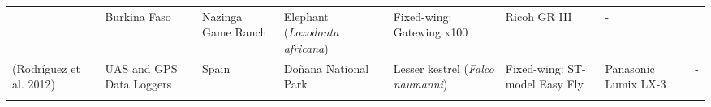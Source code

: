\documentclass[]{interact}
\theoremstyle{plain}%
\theoremstyle{definition}
\theoremstyle{remark}
\begin{document}
\begin{longtable}[]{@{}llllllll@{}}
\begin{minipage}[t]{0.18\columnwidth}
\end{minipage} & \begin{minipage}[t]{0.03\columnwidth}\raggedright\strut
Burkina Faso\strut
\end{minipage} & \begin{minipage}[t]{0.14\columnwidth}\raggedright\strut
Nazinga Game Ranch\strut
\end{minipage} & \begin{minipage}[t]{0.10\columnwidth}\raggedright\strut
Elephant (\emph{Loxodonta africana})\strut
\end{minipage} & \begin{minipage}[t]{0.09\columnwidth}\raggedright\strut
Fixed-wing: Gatewing x100\strut
\end{minipage} & \begin{minipage}[t]{0.11\columnwidth}\raggedright\strut
Ricoh GR III\strut
\end{minipage} & \begin{minipage}[t]{0.01\columnwidth}\raggedright\strut
-\strut
\end{minipage}\tabularnewline
\begin{minipage}[t]{0.11\columnwidth}\raggedright\strut
(Rodríguez et al. 2012)\strut
\end{minipage} & \begin{minipage}[t]{0.18\columnwidth}\raggedright\strut
UAS and GPS Data Loggers\strut
\end{minipage} & \begin{minipage}[t]{0.03\columnwidth}\raggedright\strut
Spain\strut
\end{minipage} & \begin{minipage}[t]{0.14\columnwidth}\raggedright\strut
Doñana National Park\strut
\end{minipage} & \begin{minipage}[t]{0.10\columnwidth}\raggedright\strut
Lesser kestrel (\emph{Falco naumanni})\strut
\end{minipage} & \begin{minipage}[t]{0.09\columnwidth}\raggedright\strut
Fixed-wing: ST-model Easy Fly\strut
\end{minipage} & \begin{minipage}[t]{0.11\columnwidth}\raggedright\strut
Panasonic Lumix LX-3\strut
\end{minipage} & \begin{minipage}[t]{0.01\columnwidth}\raggedright\strut
-\strut
\end{minipage}\tabularnewline
\begin{minipage}[t]{0.11\columnwidth}\raggedright\strut

\end{minipage}
\end{longtable}
\end{document}
